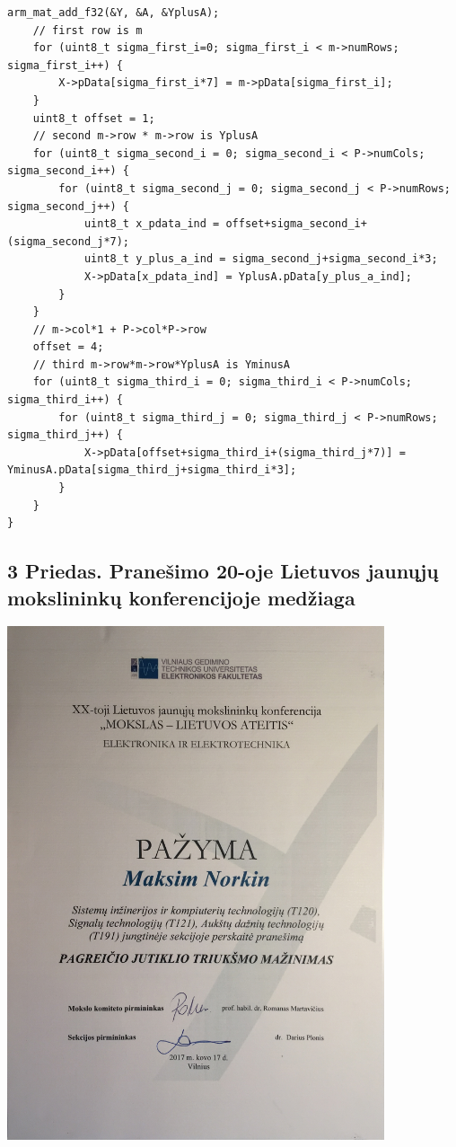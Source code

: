 \begin{lstlisting}[caption=sigma\_points.c]
    arm_mat_add_f32(&Y, &A, &YplusA);
    // first row is m
    for (uint8_t sigma_first_i=0; sigma_first_i < m->numRows; sigma_first_i++) {
        X->pData[sigma_first_i*7] = m->pData[sigma_first_i];
    }
    uint8_t offset = 1;
    // second m->row * m->row is YplusA
    for (uint8_t sigma_second_i = 0; sigma_second_i < P->numCols; sigma_second_i++) {
        for (uint8_t sigma_second_j = 0; sigma_second_j < P->numRows; sigma_second_j++) {
            uint8_t x_pdata_ind = offset+sigma_second_i+(sigma_second_j*7);
            uint8_t y_plus_a_ind = sigma_second_j+sigma_second_i*3;
            X->pData[x_pdata_ind] = YplusA.pData[y_plus_a_ind];
        }
    }
    // m->col*1 + P->col*P->row
    offset = 4;
    // third m->row*m->row*YplusA is YminusA
    for (uint8_t sigma_third_i = 0; sigma_third_i < P->numCols; sigma_third_i++) {
        for (uint8_t sigma_third_j = 0; sigma_third_j < P->numRows; sigma_third_j++) {
            X->pData[offset+sigma_third_i+(sigma_third_j*7)] = YminusA.pData[sigma_third_j+sigma_third_i*3];
        }
    }
}

\end{lstlisting}

\newpage

\subsection*{3 Priedas. Pranešimo 20-oje Lietuvos jaunųjų mokslininkų konferencijoje medžiaga}

\begin{centering}
    \includegraphics[width=420px]{img/IMG_0415.JPG}
\end{centering}

